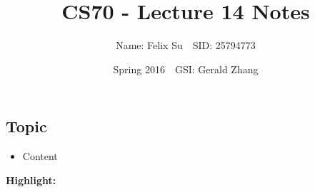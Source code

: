 \documentclass{article}\usepackage{amsmath,amssymb,amsthm,tikz,tkz-graph,color,chngpage,soul,hyperref,csquotes,graphicx,floatrow, listings}\newcommand*{\QEDB}{\hfill\ensuremath{\square}}\newtheorem*{prop}{Proposition}\renewcommand{\theenumi}{\alph{enumi}}\usepackage[shortlabels]{enumitem}\usepackage[nobreak=true]{mdframed}\usetikzlibrary{matrix,calc}\MakeOuterQuote{"}\usepackage[margin=0.75in]{geometry} \newtheorem{theorem}{Theorem}\newcommand{\Z}{\mathbb Z}\newcommand{\R}{\mathbb R}\newcommand{\Q}{\mathbb Q}\newcommand{\N}{\mathbb N}
\title{CS70 - Lecture 14 Notes}
\author{Name: Felix Su$\quad$SID: 25794773}
\date{Spring 2016$\quad$GSI: Gerald Zhang}
\begin{document}
\maketitle

\subsection*{Topic}
\begin{itemize}
\item Content
\end{itemize}
\begin{mdframed}
\textbf{Highlight:}\\
\end{mdframed}
\end{document}
